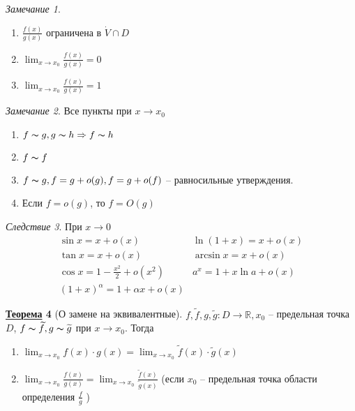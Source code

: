 \documentclass[12pt]{article}
\newenvironment{MyList}[1][4pt]{
  \begin{enumerate}[1.]
  \setlength{\parskip}{0pt}
  \setlength{\itemsep}{#1}
}{       
  \end{enumerate}
}
\def\R{\mathbb{R}}       %
\def\SO{\Rightarrow}     %
\theoremstyle{definition} %
\newtheorem{Thm}{\underline{Теорема}}[subsection] %
\theoremstyle{plain} %
\theoremstyle{remark} %
\newtheorem{Cons}[Thm]{Следствие} %
\newtheorem{Rem}[Thm]{Замечание} %
\begin{document}
\begin{Rem}
    \begin{MyList}
        \item $ \frac{f(x)}{g(x)}$ ограничена в $\dot{V} \cap D$
        \item $\lim_{x \to x_0} \frac{f(x)}{g(x)} = 0$
        \item $\lim_{x \to x_0} \frac{f(x)}{g(x)} = 1$    
    \end{MyList}
\end{Rem}

\begin{Rem}
    Все пункты при $x \to x_0$ 
    \begin{MyList}
        \item $f \thicksim g, g \thicksim h \SO f \thicksim h$ 
        \item $f \thicksim f$ 
        \item $f \thicksim g, f = g + o(g), f = g + o(f)$ -- равносильные утверждения.
        \item Если $f = o(g)$, то $f = O(g)$ 
    \end{MyList}
\end{Rem}

\begin{Cons}
    При $x \to 0$
    \[
    \begin{array}{cc}
    \sin x = x + o(x) & \ln(1 + x) = x + o(x)  \\ 
    \tan x = x + o(x)  & \arcsin x = x + o(x) \\ 
    \cos x = 1 - \frac{x^2}{2} + o(x^2)  & a^x = 1 + x\ln a + o(x)  \\ 
    (1 + x)^\alpha = 1 + \alpha x + o(x)  &
    \end{array}
    \]
\end{Cons}

\begin{Thm}[О замене на эквивалентные]
    $f, \widetilde{f}, g, \widetilde{g} : D \to \R, x_0$ -- предельная точка $D$, $f \thicksim \widetilde{f}, g \thicksim \widetilde{g}$ при $x \to x_0$. 
    Тогда
    \begin{MyList}
        \item $\lim_{x \to x_0} f(x) \cdot g(x) = \lim_{x \to x_0} \widetilde{f}(x) \cdot \widetilde{g}(x)$
        \item $\lim_{x \to x_0} \frac{f(x)}{g(x)} = \lim_{x \to x_0} \frac{\widetilde{f}(x)}{\widetilde{g}(x)}$ (если $x_0$ -- предельная точка области определения $\frac{f}{g}$ )  
    \end{MyList}
\end{Thm}
\end{document}
